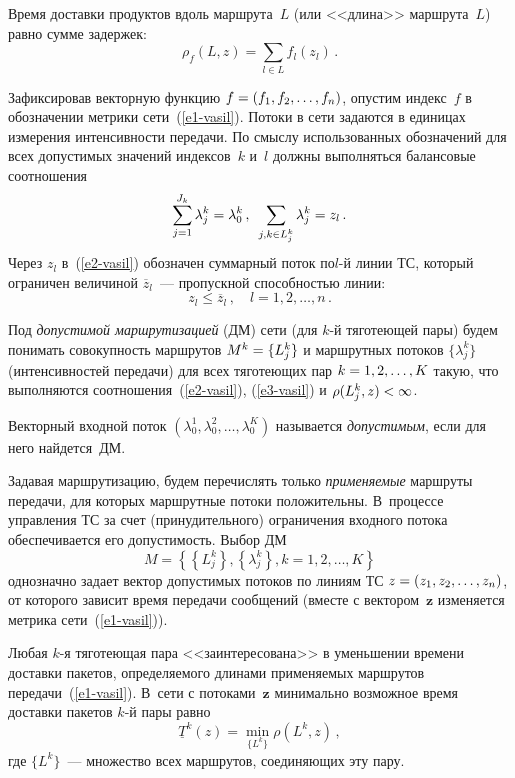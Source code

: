 \begin{multicols}{2}
  Время доставки продуктов вдоль маршрута~$L$ (или <<длина>> маршрута~$L$) 
равно сумме задержек:
  \begin{equation}
  \rho_f (L,z)=\sum\limits_{l\in L} f_l(z_l)\,.
  \label{e1-vasil}
  \end{equation}
  
  Зафиксировав векторную функцию $f\hm=(f_1,f_2,\ldots , f_n)$, опустим 
индекс~$f$ в обозначении метрики сети~(\ref{e1-vasil}). Потоки в сети задаются в 
единицах измерения интенсивности передачи. По смыслу использованных 
обозначений для всех допустимых значений индексов~$k$ и~$l$ должны 
выполняться балансовые соотношения
  \begin{equation}
  \sum\limits_{j=1}^{J_k} \lambda_j^k=\lambda_0^k\,,\enskip \sum\limits_{j,k\in 
L_j^k} \lambda_j^k=z_l\,.
  \label{e2-vasil}
  \end{equation}
    Через $z_l$ в~(\ref{e2-vasil}) обозначен суммарный поток по\linebreak $l$-й линии ТС, 
который ограничен величиной $\overline{z}_l$~--- пропускной способностью 
линии:
  \begin{equation}
  z_l\leq \overline{z}_l\,,\quad l=1, 2, \ldots ,n\,.
  \label{e3-vasil}
  \end{equation}
  
  Под \textit{допустимой маршрутизацией} (ДМ) сети (для $k$-й тяготеющей 
пары) будем понимать совокупность маршрутов $M^k\hm=\{L_j^k\}$ и 
маршрутных потоков $\{\lambda_j^k\}$ (интенсивностей передачи) для всех 
тяготеющих пар $k\hm=1, 2, \ldots , K$ такую, что выполняются 
соотношения~(\ref{e2-vasil}), (\ref{e3-vasil}) и $\rho(L_j^k,z)\hm<\infty$. 
  
  Векторный входной поток $(\lambda_0^1, \lambda_0^2, \ldots , \lambda_0^K)$ 
называется \textit{допустимым}, если для него найдется~ДМ.
  
  Задавая маршрутизацию, будем перечислять только \textit{применяемые} 
маршруты передачи, для которых маршрутные потоки положительны. В~процессе 
управ\-ле\-ния ТС за счет (принудительного) ограничения входного потока 
обеспечивается его допустимость. Выбор ДМ
  $$
  M=\left\{ \left\{ L_j^k\right\}, \left\{ \lambda_j^k\right\}, k=1, 2, \ldots ,K\right\}
  $$
однозначно задает вектор допустимых потоков по линиям ТС $z\hm= (z_1, z_2, 
\ldots , z_n)$, от которого зависит время передачи сообщений (вместе с 
вектором~$\mathbf{z}$ изменяется метрика сети~(\ref{e1-vasil})). 
  
  Любая $k$-я тяготеющая пара <<заинтересована>> в уменьшении времени 
доставки пакетов, определяемого длинами применяемых маршрутов 
передачи~(\ref{e1-vasil}). В~сети с потоками~$\mathbf{z}$ минимально возможное 
время доставки пакетов $k$-й пары равно
  $$
 \underline{T}^k(z)=\min\limits_{\{L^k\}} \rho(L^k,z)\,,
  $$
  где $\{L^k\}$~--- множество всех маршрутов, соединя\-ющих эту пару.
  

\end{multicols}
